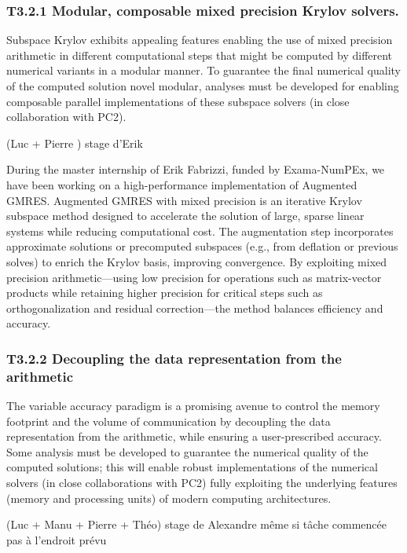  \subsubsection{ 
 T3.2.1 Modular, composable mixed precision Krylov solvers. 
 }
  Subspace Krylov exhibits appealing
features enabling the use of mixed precision arithmetic in different computational steps that might be
computed by different numerical variants in a modular manner. To guarantee the final numerical
quality of the computed solution novel modular, analyses must be developed for enabling composable
parallel implementations of these subspace solvers (in close collaboration with PC2).

(Luc + Pierre ) stage d'Erik 

During the master internship of Erik Fabrizzi, funded by Exama-NumPEx, we have been working on a high-performance implementation of Augmented GMRES. Augmented GMRES with mixed precision is an iterative Krylov subspace method designed to accelerate the solution of large, sparse linear systems while reducing computational cost. The augmentation step incorporates approximate solutions or precomputed subspaces (e.g., from deflation or previous solves) to enrich the Krylov basis, improving convergence. By exploiting mixed precision arithmetic—using low precision for operations such as matrix-vector products while retaining higher precision for critical steps such as orthogonalization and residual correction—the method balances efficiency and accuracy. 

 \subsubsection{ T3.2.2 Decoupling the data representation from the arithmetic}

The variable accuracy paradigm is a promising avenue to control the memory footprint and the
volume of communication by decoupling the data representation from the arithmetic, while ensuring a
user-prescribed accuracy. Some analysis must be developed to guarantee the numerical quality of the
computed solutions; this will enable robust implementations of the numerical solvers (in close
collaborations with PC2) fully exploiting the underlying features (memory and processing units) of
modern computing architectures. 

(Luc + Manu + Pierre + Théo) stage de Alexandre même si tâche commencée pas à l'endroit prévu 

